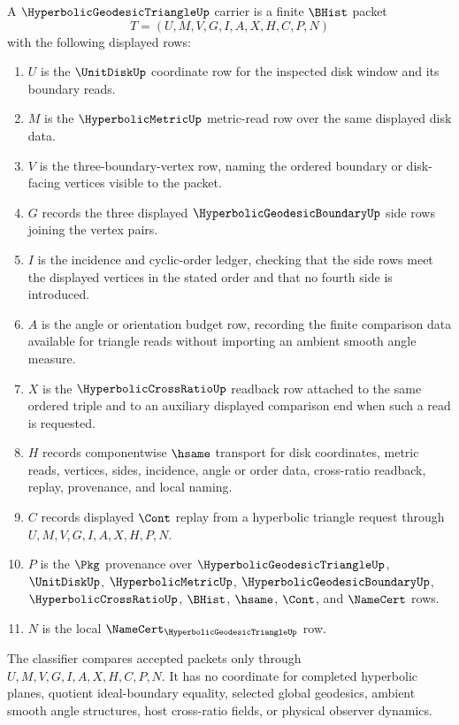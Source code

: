 \begin{definition}
\label{def:hyperbolic-geodesic-triangle-carrier}
A $\HyperbolicGeodesicTriangleUp$ carrier is a finite $\BHist$ packet
$$
T=(U,M,V,G,I,A,X,H,C,P,N)
$$
with the following displayed rows:
\begin{enumerate}
\item $U$ is the $\UnitDiskUp$ coordinate row for the inspected disk window and its boundary reads.
\item $M$ is the $\HyperbolicMetricUp$ metric-read row over the same displayed disk data.
\item $V$ is the three-boundary-vertex row, naming the ordered boundary or disk-facing vertices visible to the packet.
\item $G$ records the three displayed $\HyperbolicGeodesicBoundaryUp$ side rows joining the vertex pairs.
\item $I$ is the incidence and cyclic-order ledger, checking that the side rows meet the displayed vertices in the stated order and that no fourth side is introduced.
\item $A$ is the angle or orientation budget row, recording the finite comparison data available for triangle reads without importing an ambient smooth angle measure.
\item $X$ is the $\HyperbolicCrossRatioUp$ readback row attached to the same ordered triple and to an auxiliary displayed comparison end when such a read is requested.
\item $H$ records componentwise $\hsame$ transport for disk coordinates, metric reads, vertices, sides, incidence, angle or order data, cross-ratio readback, replay, provenance, and local naming.
\item $C$ records displayed $\Cont$ replay from a hyperbolic triangle request through $U,M,V,G,I,A,X,H,P,N$.
\item $P$ is the $\Pkg$ provenance over $\HyperbolicGeodesicTriangleUp$, $\UnitDiskUp$, $\HyperbolicMetricUp$, $\HyperbolicGeodesicBoundaryUp$, $\HyperbolicCrossRatioUp$, $\BHist$, $\hsame$, $\Cont$, and $\NameCert$ rows.
\item $N$ is the local $\NameCert_{\HyperbolicGeodesicTriangleUp}$ row.
\end{enumerate}
The classifier compares accepted packets only through $U,M,V,G,I,A,X,H,C,P,N$. It has no coordinate for completed hyperbolic planes, quotient ideal-boundary equality, selected global geodesics, ambient smooth angle structures, host cross-ratio fields, or physical observer dynamics.
\end{definition}

